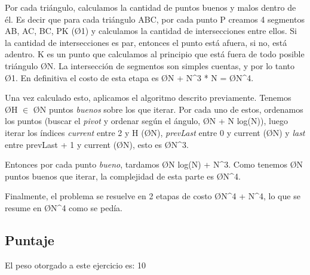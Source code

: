 Por cada triángulo, calculamos la cantidad de puntos buenos y malos dentro de él. Es decir que para cada triángulo ABC, por cada punto P creamos 4 segmentos AB, AC, BC, PK (\O{1}) y calculamos la cantidad de intersecciones entre ellos. Si la cantidad de intersecciones es par, entonces el punto está afuera, si no, está adentro. K es un punto que calculamos al principio que está fuera de todo posible triángulo \O{N}. La intersección de segmentos son simples cuentas, y por lo tanto \O{1}. En definitiva el costo de esta etapa es \O{N + N^3 * N} = \O{N^4}.

Una vez calculado esto, aplicamos el algoritmo descrito previamente. Tenemos \O{H} $\in$ \O{N} puntos \textit{buenos} sobre los que iterar. Por cada uno de estos, ordenamos los puntos (buscar el \textit{pivot} y ordenar según el ángulo, \O{N + N log(N)}), luego iterar los índices \textit{current} entre 2 y H (\O{N}), \textit{prevLast} entre 0 y current (\O{N}) y \textit{last} entre prevLast + 1 y current (\O{N}), esto es \O{N^3}.

Entonces por cada punto \textit{bueno}, tardamos \O{N log(N) + N^3}. Como tenemos \O{N} puntos buenos que iterar, la complejidad de esta parte es \O{N^4}.

Finalmente, el problema se resuelve en 2 etapas de costo \O{N^4 + N^4}, lo que se resume en \O{N^4} como se pedía.

\subsection{Puntaje}
El peso otorgado a este ejercicio es: 10
